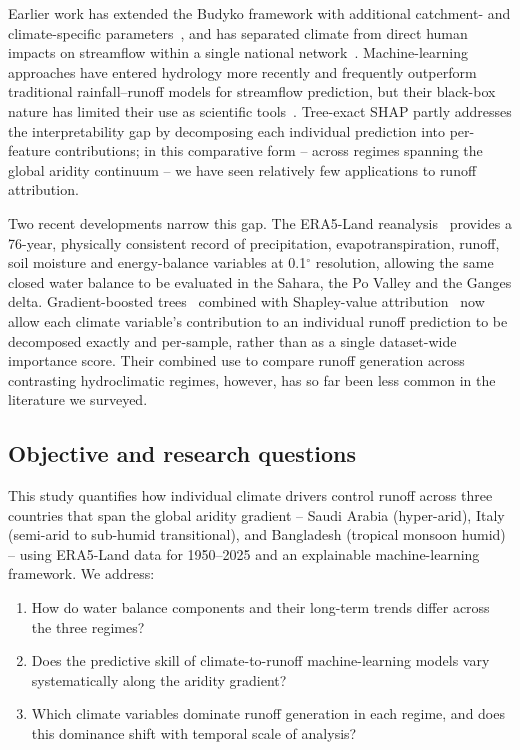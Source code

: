\documentclass[11pt]{article}
\begin{document}
Earlier work has extended the Budyko framework with additional catchment- and climate-specific parameters~\cite{roderick2011}, and has separated climate from direct human impacts on streamflow within a single national network~\cite{wang2011}. Machine-learning approaches have entered hydrology more recently and frequently outperform traditional rainfall--runoff models for streamflow prediction, but their black-box nature has limited their use as scientific tools~\cite{nearing2021}. Tree-exact SHAP partly addresses the interpretability gap by decomposing each individual prediction into per-feature contributions; in this comparative form -- across regimes spanning the global aridity continuum -- we have seen relatively few applications to runoff attribution.

Two recent developments narrow this gap. The ERA5-Land reanalysis~\cite{munoz2021era5land} provides a 76-year, physically consistent record of precipitation, evapotranspiration, runoff, soil moisture and energy-balance variables at 0.1$^\circ$ resolution, allowing the same closed water balance to be evaluated in the Sahara, the Po Valley and the Ganges delta. Gradient-boosted trees~\cite{xgboost2016} combined with Shapley-value attribution~\cite{lundberg2017shap,lundberg2020shaptrees} now allow each climate variable's contribution to an individual runoff prediction to be decomposed exactly and per-sample, rather than as a single dataset-wide importance score. Their combined use to compare runoff generation across contrasting hydroclimatic regimes, however, has so far been less common in the literature we surveyed.

\subsection{Objective and research questions}

This study quantifies how individual climate drivers control runoff across three countries that span the global aridity gradient -- Saudi Arabia (hyper-arid), Italy (semi-arid to sub-humid transitional), and Bangladesh (tropical monsoon humid) -- using ERA5-Land data for 1950--2025 and an explainable machine-learning framework. We address:

\begin{enumerate}
    \item How do water balance components and their long-term trends differ across the three regimes?
    \item Does the predictive skill of climate-to-runoff machine-learning models vary systematically along the aridity gradient?
    \item Which climate variables dominate runoff generation in each regime, and does this dominance shift with temporal scale of analysis?
\end{enumerate}
\end{document}
